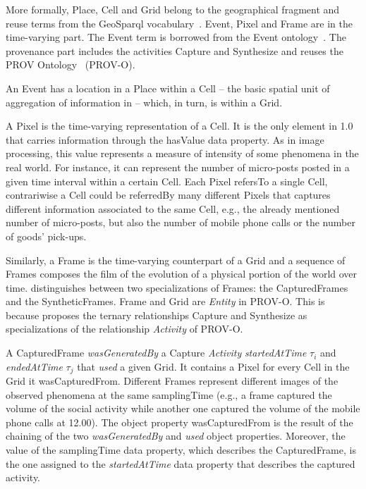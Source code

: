 More formally, \textsf{Place}, \textsf{Cell} and \textsf{Grid} belong to the geographical fragment and reuse terms from the GeoSparql vocabulary~\cite{battle2011geosparql}. 
\textsf{Event}, \textsf{Pixel} and \textsf{Frame} are in the time-varying part. The \textsf{Event} term is borrowed from the Event ontology~\cite{RaimondAbdallahEventOntology2007}. 
The provenance part includes the activities \textsf{Capture} and \textsf{Synthesize} and reuses the PROV Ontology~\cite{w3c-prov-o} (PROV-O).

An \textsf{Event} has a \textsf{location} in a \textsf{Place} within a \textsf{Cell} -- the basic spatial unit of aggregation of information in \frappe{} -- which, in turn, is within a \textsf{Grid}.

A \textsf{Pixel} is the time-varying representation of a \textsf{Cell}. It is the only element in \frappe{} 1.0 that carries information through the \textsf{hasValue} data property. As in image processing, this value represents a measure of intensity of some phenomena in the real world. For instance, it can represent the number of micro-posts posted in a given time interval within a certain \textsf{Cell}. Each \textsf{Pixel} \textsf{refersTo} a single \textsf{Cell}, contrariwise a \textsf{Cell} could be \textsf{referredBy} many different \textsf{Pixel}s that captures different information associated to the same \textsf{Cell}, e.g., the already mentioned number of micro-posts, but also the number of mobile phone calls or the number of goods' pick-ups.

Similarly, a \textsf{Frame} is the time-varying counterpart of a \textsf{Grid} and a sequence of \textsf{Frame}s composes the film of the evolution of a physical portion of the world over time. 
\frappe{} distinguishes between two specializations of \textsf{Frame}s: the \textsf{CapturedFrame}s and the \textsf{SyntheticFrame}s. 
\textsf{Frame} and \textsf{Grid} are \textit{Entity} in PROV-O. This is because \frappe{} proposes the ternary relationships \textsf{Capture} and \textsf{Synthesize} as specializations of the relationship \textit{Activity} of PROV-O.

A \textsf{CapturedFrame} \textit{wasGeneratedBy} a \textsf{Capture} \textit{Activity} \textit{startedAtTime} $\tau_i$ and \textit{endedAtTime} $\tau_j$ that \textit{used} a given \textsf{Grid}. It \textsf{contains} a \textsf{Pixel} for every \textsf{Cell} in the \textsf{Grid} it \textsf{wasCapturedFrom}. Different \textsf{Frame}s represent different images of the observed phenomena at the same \textsf{samplingTime} (e.g., a frame captured the volume of the social activity while another one captured the volume of the mobile phone calls at 12.00).
The object property \textsf{wasCapturedFrom} is the result of the chaining of the two \textit{wasGeneratedBy} and \textit{used} object properties. Moreover, the value of the \textsf{samplingTime} data property, which describes the \textsf{CapturedFrame}, is the one assigned to the \textit{startedAtTime} data property that describes the captured activity. 

